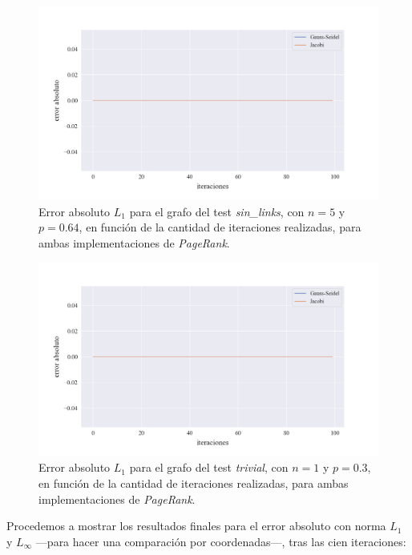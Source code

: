 \begin{figure}[!htbp]
    \centering
    \includegraphics[width=1\textwidth]{files/src/.media/convergencia_test_sin_links.png}
    \caption{Error absoluto $L_1$ para el grafo del test \textit{sin\_links}, con $n = 5$ y $p = 0.64$, en función de la cantidad de iteraciones realizadas, para ambas implementaciones de \textit{PageRank}.} \label{test_sin_links}
\end{figure}

\begin{figure}[!htbp]
    \centering
    \includegraphics[width=1\textwidth]{files/src/.media/convergencia_test_trivial.png}
    \caption{Error absoluto $L_1$ para el grafo del test \textit{trivial}, con $n = 1$ y $p = 0.3$, en función de la cantidad de iteraciones realizadas, para ambas implementaciones de \textit{PageRank}.} \label{test_trivial}
\end{figure}

\vspace*{1em}
Procedemos a mostrar los resultados finales para el error absoluto con norma $L_1$ y $L_{\infty}$ ---para hacer una comparación por coordenadas---, tras las cien iteraciones:

